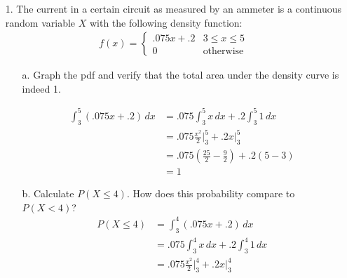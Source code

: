 \documentclass[letterpaper,12pt]{article}
\begin{document}
\maketitle

\begin{enumerate}
  \item[1.]
    The current in a certain circuit as measured by an ammeter is a continuous random variable $X$ with the following density function:
    \begin{align*}
      f(x) = \begin{cases}
        .075x + .2 & 3 \le x \le 5 \\
        0          & \text{otherwise}
      \end{cases}
    \end{align*}
    \begin{enumerate}
      \item[a.]
        Graph the pdf and verify that the total area under the density curve is indeed 1.
        \begin{center}
        \end{center}
        \begin{align*}
           \int_3^5 (.075x + .2)\,dx &= .075\int_3^5 x\,dx + .2\int_3^5 1\,dx \\
           &= .075\frac{x^2}{2}\bigg\rvert_3^5 + .2x\big\rvert_3^5 \\
           &= .075\left(\frac{25}{2} - \frac{9}{2}\right) + .2(5 - 3) \\
           &= 1
        \end{align*}
      \item[b.]
        Calculate $P(X \le 4)$. How does this probability compare to $P(X < 4)$?
        \begin{align*}
          P(X \le 4) &= \int_3^4 (.075x + .2)\,dx \\
          &= .075\int_3^4 x\,dx + .2\int_3^4 1\,dx \\
          &= .075\frac{x^2}{2}\bigg\rvert_3^4 + .2x\big\rvert_3^4 \\

\end{align*}
\end{enumerate}
\end{enumerate}
\end{document}
